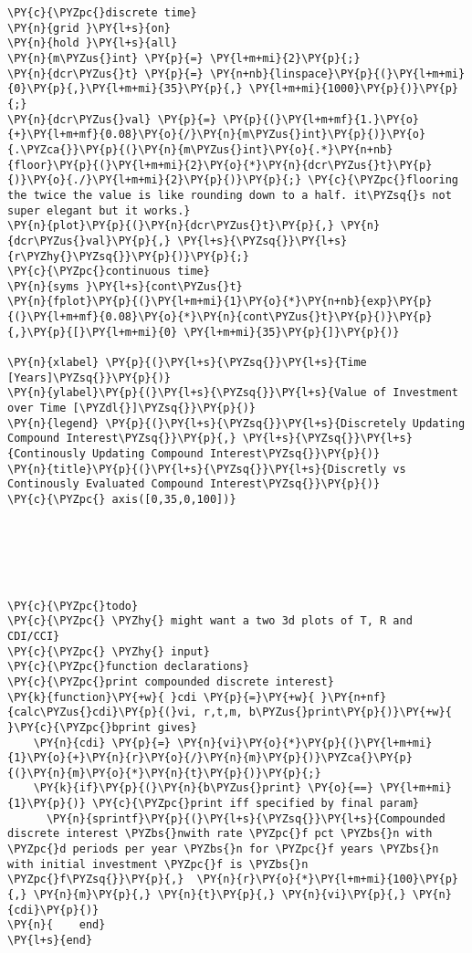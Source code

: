 \begin{Verbatim}[commandchars=\\\{\}]
\PY{c}{\PYZpc{}discrete time}
\PY{n}{grid }\PY{l+s}{on}
\PY{n}{hold }\PY{l+s}{all}
\PY{n}{m\PYZus{}int} \PY{p}{=} \PY{l+m+mi}{2}\PY{p}{;}
\PY{n}{dcr\PYZus{}t} \PY{p}{=} \PY{n+nb}{linspace}\PY{p}{(}\PY{l+m+mi}{0}\PY{p}{,}\PY{l+m+mi}{35}\PY{p}{,} \PY{l+m+mi}{1000}\PY{p}{)}\PY{p}{;}
\PY{n}{dcr\PYZus{}val} \PY{p}{=} \PY{p}{(}\PY{l+m+mf}{1.}\PY{o}{+}\PY{l+m+mf}{0.08}\PY{o}{/}\PY{n}{m\PYZus{}int}\PY{p}{)}\PY{o}{.\PYZca{}}\PY{p}{(}\PY{n}{m\PYZus{}int}\PY{o}{.*}\PY{n+nb}{floor}\PY{p}{(}\PY{l+m+mi}{2}\PY{o}{*}\PY{n}{dcr\PYZus{}t}\PY{p}{)}\PY{o}{./}\PY{l+m+mi}{2}\PY{p}{)}\PY{p}{;} \PY{c}{\PYZpc{}flooring the twice the value is like rounding down to a half. it\PYZsq{}s not super elegant but it works.}
\PY{n}{plot}\PY{p}{(}\PY{n}{dcr\PYZus{}t}\PY{p}{,} \PY{n}{dcr\PYZus{}val}\PY{p}{,} \PY{l+s}{\PYZsq{}}\PY{l+s}{r\PYZhy{}\PYZsq{}}\PY{p}{)}\PY{p}{;}
\PY{c}{\PYZpc{}continuous time}
\PY{n}{syms }\PY{l+s}{cont\PYZus{}t}
\PY{n}{fplot}\PY{p}{(}\PY{l+m+mi}{1}\PY{o}{*}\PY{n+nb}{exp}\PY{p}{(}\PY{l+m+mf}{0.08}\PY{o}{*}\PY{n}{cont\PYZus{}t}\PY{p}{)}\PY{p}{,}\PY{p}{[}\PY{l+m+mi}{0} \PY{l+m+mi}{35}\PY{p}{]}\PY{p}{)}

\PY{n}{xlabel} \PY{p}{(}\PY{l+s}{\PYZsq{}}\PY{l+s}{Time [Years]\PYZsq{}}\PY{p}{)}
\PY{n}{ylabel}\PY{p}{(}\PY{l+s}{\PYZsq{}}\PY{l+s}{Value of Investment over Time [\PYZdl{}]\PYZsq{}}\PY{p}{)}
\PY{n}{legend} \PY{p}{(}\PY{l+s}{\PYZsq{}}\PY{l+s}{Discretely Updating Compound Interest\PYZsq{}}\PY{p}{,} \PY{l+s}{\PYZsq{}}\PY{l+s}{Continously Updating Compound Interest\PYZsq{}}\PY{p}{)}
\PY{n}{title}\PY{p}{(}\PY{l+s}{\PYZsq{}}\PY{l+s}{Discretly vs Continously Evaluated Compound Interest\PYZsq{}}\PY{p}{)}
\PY{c}{\PYZpc{} axis([0,35,0,100])}






\PY{c}{\PYZpc{}todo}
\PY{c}{\PYZpc{} \PYZhy{} might want a two 3d plots of T, R and CDI/CCI}
\PY{c}{\PYZpc{} \PYZhy{} input}
\PY{c}{\PYZpc{}function declarations}
\PY{c}{\PYZpc{}print compounded discrete interest}
\PY{k}{function}\PY{+w}{ }cdi \PY{p}{=}\PY{+w}{ }\PY{n+nf}{calc\PYZus{}cdi}\PY{p}{(}vi, r,t,m, b\PYZus{}print\PY{p}{)}\PY{+w}{ }\PY{c}{\PYZpc{}bprint gives}
    \PY{n}{cdi} \PY{p}{=} \PY{n}{vi}\PY{o}{*}\PY{p}{(}\PY{l+m+mi}{1}\PY{o}{+}\PY{n}{r}\PY{o}{/}\PY{n}{m}\PY{p}{)}\PYZca{}\PY{p}{(}\PY{n}{m}\PY{o}{*}\PY{n}{t}\PY{p}{)}\PY{p}{;}
    \PY{k}{if}\PY{p}{(}\PY{n}{b\PYZus{}print} \PY{o}{==} \PY{l+m+mi}{1}\PY{p}{)} \PY{c}{\PYZpc{}print iff specified by final param}
      \PY{n}{sprintf}\PY{p}{(}\PY{l+s}{\PYZsq{}}\PY{l+s}{Compounded discrete interest \PYZbs{}nwith rate \PYZpc{}f pct \PYZbs{}n with \PYZpc{}d periods per year \PYZbs{}n for \PYZpc{}f years \PYZbs{}n with initial investment \PYZpc{}f is \PYZbs{}n \PYZpc{}f\PYZsq{}}\PY{p}{,}  \PY{n}{r}\PY{o}{*}\PY{l+m+mi}{100}\PY{p}{,} \PY{n}{m}\PY{p}{,} \PY{n}{t}\PY{p}{,} \PY{n}{vi}\PY{p}{,} \PY{n}{cdi}\PY{p}{)}
\PY{n}{    end}
\PY{l+s}{end}


\end{Verbatim}
